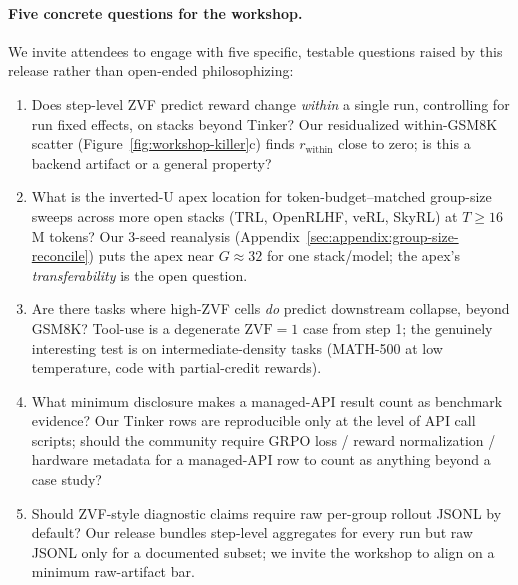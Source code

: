 \paragraph{Five concrete questions for the workshop.}
We invite attendees to engage with five specific, testable questions raised
by this release rather than open-ended philosophizing:
\begin{enumerate}[leftmargin=1.4em,topsep=2pt,itemsep=2pt]
  \item Does step-level ZVF predict reward change \emph{within} a single
        run, controlling for run fixed effects, on stacks beyond Tinker?
        Our residualized within-GSM8K scatter
        (Figure~\ref{fig:workshop-killer}c) finds $r_{\mathrm{within}}$
        close to zero; is this a backend artifact or a general property?
  \item What is the inverted-U apex location for token-budget--matched
        group-size sweeps across more open stacks (TRL, OpenRLHF, veRL,
        SkyRL) at $T{\geq}16$M tokens? Our 3-seed reanalysis
        (Appendix~\ref{sec:appendix:group-size-reconcile}) puts the
        apex near $G{\approx}32$ for one stack/model; the apex's
        \emph{transferability} is the open question.
  \item Are there tasks where high-ZVF cells \emph{do} predict downstream
        collapse, beyond GSM8K? Tool-use is a degenerate $\mathrm{ZVF}{=}1$
        case from step 1; the genuinely interesting test is on
        intermediate-density tasks (MATH-500 at low temperature, code
        with partial-credit rewards).
  \item What minimum disclosure makes a managed-API result count as
        benchmark evidence? Our Tinker rows are reproducible only at the
        level of API call scripts; should the community require GRPO
        loss / reward normalization / hardware metadata for a managed-API
        row to count as anything beyond a case study?
  \item Should ZVF-style diagnostic claims require raw per-group rollout
        JSONL by default? Our release bundles step-level aggregates for
        every run but raw JSONL only for a documented subset; we invite
        the workshop to align on a minimum raw-artifact bar.
\end{enumerate}
